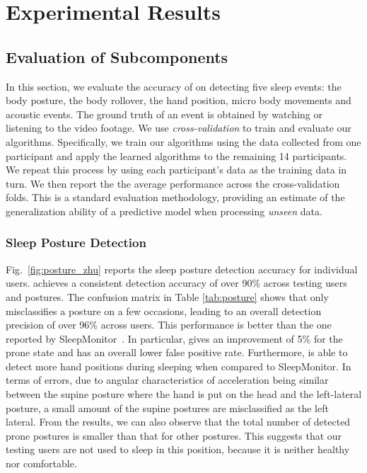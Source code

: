 \section{Experimental Results}\label{sec:4experiment}

\subsection{Evaluation of Subcomponents}
In this section, we evaluate the accuracy of \systemname on detecting five sleep events: the body posture, the body rollover, the hand
position, micro body movements and acoustic events. The ground truth of an event is obtained by watching or listening to the video footage.
We use \emph{cross-validation} to train and evaluate our algorithms. Specifically, we train our algorithms using the data collected from
one participant and apply the learned algorithms to the remaining 14 participants. We repeat this process by using each participant's data
as the training data in turn. We then report the the average performance across the cross-validation folds. This is a standard evaluation
methodology, providing an estimate of the generalization ability of a predictive model when processing \emph{unseen} data.

\subsubsection{Sleep Posture Detection}
\label{subsub:bodyposture} Fig.~\ref{fig:posture_zhu} reports the sleep posture detection accuracy for individual users. \systemname
achieves a consistent detection accuracy of over 90\% across testing users and postures. The confusion matrix in Table \ref{tab:posture}
shows that \systemname only misclassifies a posture on a few occasions, leading to an overall detection precision of over 96\% across
users. This performance is better than the one reported by SleepMonitor~\cite{sleepmonitor}. In particular, {\systemname} gives an
improvement of 5\% for the prone state and has an overall lower false positive rate. Furthermore, {\systemname} is able to detect more hand
positions during sleeping when compared to SleepMonitor. In terms of errors, due to angular characteristics of acceleration being similar
between the supine posture where the hand is put on the head and the left-lateral posture, a small amount of the supine postures are
misclassified as the left lateral. From the results, we can also observe that the total number of detected prone postures is smaller than
that for other postures. This suggests that our testing users are not used to sleep in this position, because it is neither healthy nor
comfortable.






